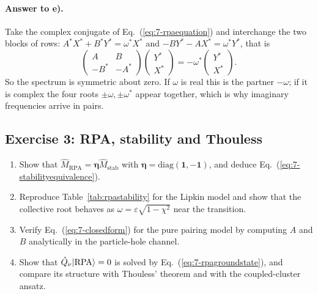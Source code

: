 \paragraph{Answer to e).}
Take the complex conjugate of Eq.~(\ref{eq:7-rpaequation}) and interchange the
two blocks of rows:
$A^{*}X^{*}+B^{*}Y^{*}=\omega^{*}X^{*}$ and
$-BY^{*}-AX^{*}=\omega^{*}Y^{*}$, that is
\begin{equation}
  \begin{pmatrix}A & B\\ -B^{*} & -A^{*}\end{pmatrix}
  \begin{pmatrix}Y^{*}\\ X^{*}\end{pmatrix}
  = -\omega^{*}\begin{pmatrix}Y^{*}\\ X^{*}\end{pmatrix}.
  \label{eq:7-exe2}
\end{equation}
So the spectrum is symmetric about zero.  If $\omega$ is real this is the
partner $-\omega$; if it is complex the four roots
$\pm\omega,\pm\omega^{*}$ appear together, which is why imaginary
frequencies arrive in pairs.

\subsection*{Exercise 3: RPA, stability and Thouless}
\label{ex:7-thouless}

\begin{enumerate}
  \item[a)] Show that $\hat{M}_{\mathrm{RPA}}=\bm{\eta}
  \hat{M}_{\mathrm{stab}}$ with $\bm{\eta}=\mathrm{diag}(\bm{1},-\bm{1})$,
  and deduce Eq.~(\ref{eq:7-stabilityequivalence}).
  \item[b)] Reproduce Table~\ref{tab:rpastability} for the Lipkin model and
  show that the collective root behaves as
  $\omega=\varepsilon\sqrt{1-\chi^2}$ near the transition.
  \item[c)] Verify Eq.~(\ref{eq:7-closedform}) for the pure pairing model by
  computing $A$ and $B$ analytically in the particle-hole channel.
  \item[d)] Show that $\hat{Q}_{\nu}\vert \mathrm{RPA} \rangle=0$ is solved by
  Eq.~(\ref{eq:7-rpagroundstate}), and compare its structure with Thouless'
  theorem and with the coupled-cluster ansatz.
\end{enumerate}

